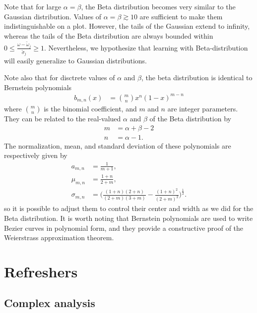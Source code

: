\documentclass[notitlepage,11pt,nofootinbib]{revtex4-1}
\begin{document}
Note that for large $\alpha=\beta$, the Beta distribution becomes very similar to the Gaussian distribution. Values of $\alpha=\beta\gtrsim 10$ are sufficient to make them indistinguishable on a plot. However, the tails of the Gaussian extend to infinity, whereas the tails of the Beta distribution are always bounded within $0 \leq \frac{\omega-\tilde{\omega}_j}{\tilde{\sigma}_j} \geq 1$. Nevertheless, we hypothesize that learning with Beta-distribution will easily generalize to Gaussian distributions.

Note also that for disctrete values of $\alpha$ and $\beta$, the beta distribution is identical to Bernstein polynomials
\begin{align}
b_{m,n}(x)
&=
\binom{m}{n} x^n(1-x)^{m-n}
\end{align}
where $\binom{m}{n}$ is the binomial coefficient, and $m$ and $n$ are integer parameters. They can be related to the real-valued $\alpha$ and $\beta$ of the Beta distribution by
\begin{align}
m &= \alpha+\beta-2
\\
n &= \alpha-1.
\end{align}
The normalization, mean, and standard deviation of these polynomials are respectively given by
\begin{align}
a_{m,n}
&=
\frac{1}{m+1},
\\
\mu_{m,n}
&=
\frac{1+n}{2+m},
\\
\sigma_{m,n}
&=
\bigg(
\frac{(1+n)(2+n)}{(2+m)(3+m)}
-
\frac{(1+n)^2}{(2+m)^2}
\bigg)^{\frac{1}{2}}.
\end{align}
so it is possible to adjust them to control their center and width as we did for the Beta distribution. It is worth noting that Bernstein polynomials are used to write Bezier curves in polynomial form, and they provide a constructive proof of the Weierstrass approximation theorem.





\appendix
\section{Refreshers}

\subsection{Complex analysis}
\end{document}
